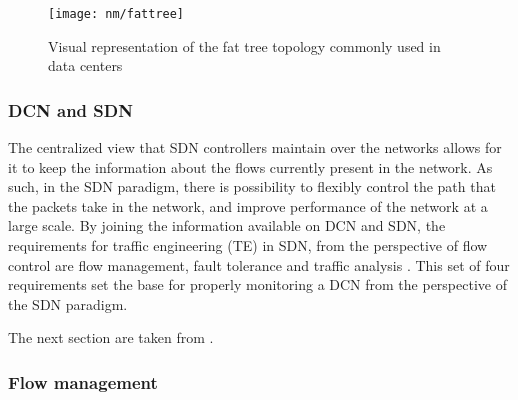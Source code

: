 \begin{figure} [!htbp]
    \centering
    \texttt{[image: nm/fattree]}
    \caption{Visual representation of the fat tree topology commonly used in data centers}
    \label{fig:fattree}
\end{figure}

\subsubsection {DCN and SDN}

\par The centralized view that SDN controllers maintain over the networks allows for it to keep the information about the flows currently present in the network. As such, in the SDN paradigm, there is possibility to flexibly control 
the path that the packets take in the network, and improve performance of the network at a large scale. By joining the information available on DCN and SDN, the requirements for traffic engineering (TE) in SDN, from
the perspective of flow control are flow management, fault tolerance and traffic analysis \cite { CITE - traffic_engineering_sdn}. This set of four requirements set the base for properly monitoring a DCN from the 
perspective of the SDN paradigm.
\par The next section are taken from \cite { CITE - traffic_engineering_sdn}.

\subsubsection {Flow management}

